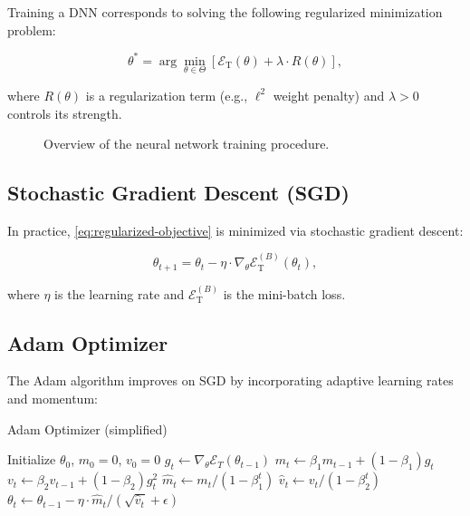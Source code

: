 Training a DNN corresponds to solving the following regularized minimization
problem:

\begin{equation}
    \theta^* = \arg\min_{\theta \in \Theta} \left[ \mathcal{E}_\mathrm{T}(\theta) + \lambda \cdot R(\theta) \right],
    \label{eq:regularized-objective}
\end{equation}

where $R(\theta)$ is a regularization term (e.g., $\ell^2$ weight penalty) and
$\lambda > 0$ controls its strength.

\begin{figure}[H]
    \centering
    \caption{Overview of the neural network training procedure.}
    \label{fig:training-pipeline}
\end{figure}

\subsection{Stochastic Gradient Descent (SGD)}

In practice, \eqref{eq:regularized-objective} is minimized via stochastic
gradient descent:

 \begin{equation*}
\theta_{t+1} = \theta_t - \eta \cdot \nabla_\theta \mathcal{E}_\mathrm{T}^{(B)}(\theta_t),
 \end{equation*}

where $\eta$ is the learning rate and $\mathcal{E}_\mathrm{T}^{(B)}$ is the
mini-batch loss.

\subsection{Adam Optimizer}

The Adam algorithm improves on SGD by incorporating adaptive learning rates and
momentum:

\begin{algorithm}[H]
\caption{Adam Optimizer (simplified)}
\begin{algorithmic}[1]
\State Initialize $\theta_0$, $m_0 = 0$, $v_0 = 0$  \State
$g_t \gets \nabla_\theta \mathcal{E}_T(\theta_{t-1})$ \State $m_t \gets \beta_1
m_{t-1} + (1 - \beta_1) g_t$ \State $v_t \gets \beta_2 v_{t-1} + (1 - \beta_2)
g_t^2$ \State $\hat{m}_t \gets m_t / (1 - \beta_1^t)$ \State $\hat{v}_t \gets
v_t / (1 - \beta_2^t)$ \State $\theta_t \gets \theta_{t-1} - \eta \cdot
\hat{m}_t / (\sqrt{\hat{v}_t} + \epsilon)$ \EndFor
\end{algorithmic}
\end{algorithm}

